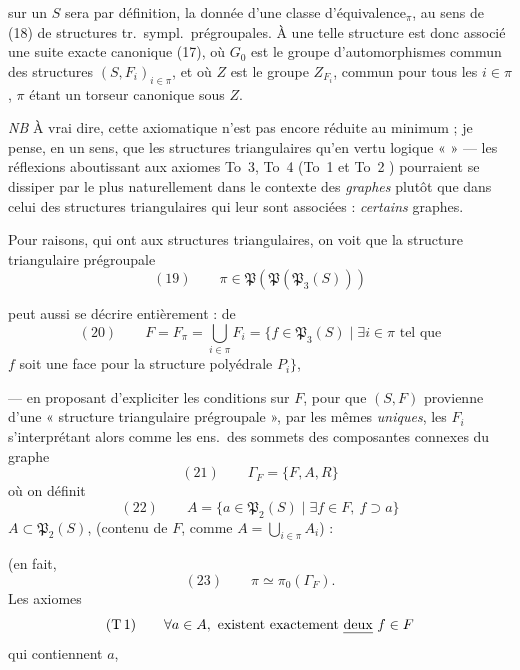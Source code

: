 \documentclass[11pt,a4paper]{article}
\begin{document}
sur  un $S$ sera par définition, la donnée
d'une classe d'équivalence$_\pi$, au sens de (18)
de structures tr.\ sympl.\ prégroupales.
À une telle structure est donc associé
une suite exacte canonique (17), où
$G_0$ est le groupe d'automorphismes commun des
structures $(S,F_i)_{i\in\pi}$, et où $Z$ est le
groupe $Z_{F_i}$, commun pour tous les $i\in\pi$,
$\pi$ étant un torseur canonique sous
$Z$.

\emph{NB} À vrai dire, cette axiomatique n'est pas
encore réduite au minimum ; je pense, en un
sens, que les structures triangulaires 
 qu'en vertu logique «  » —
les réflexions aboutissant aux axiomes
To~3, To~4 (To~1 et To~2  ) pourraient se dissiper
par le plus naturellement dans le contexte des
\emph{graphes} plutôt que dans celui des structures
triangulaires qui leur sont associées : \emph{certains} graphes.

Pour  raisons, qui ont  aux structures
triangulaires, on voit que la structure
triangulaire prégroupale
\[
(19)\qquad \pi\in\mathfrak{P}(\mathfrak{P}(\mathfrak{P}_3(S)))
\]

peut aussi se décrire entièrement : 
de
\[
(20)\qquad F=F_\pi=\bigcup_{i\in\pi}F_i=\{f\in\mathfrak{P}_3(S)\mid \exists i\in\pi \text{ tel que}
\]
\quad $f$ soit une face pour la structure polyédrale $P_i\}$,

— en proposant d'expliciter les conditions
sur $F$, pour que $(S,F)$ provienne d'une
« structure triangulaire prégroupale », par
 les mêmes \emph{uniques}, les $F_i$ s'interprétant
alors comme les ens.\ des sommets des
composantes connexes du graphe
\[
(21)\qquad \Gamma_F=\{F,A,R\}
\]
où on définit
\[
(22)\qquad A=\{a\in\mathfrak{P}_2(S)\mid \exists f\in F,\ f\supset a\}
\]
$A\subset\mathfrak{P}_2(S)$, (contenu de $F$, comme
$A=\bigcup_{i\in\pi}A_i$) :

(en fait, \ill{} \ill{}
\[
(23)\qquad \pi\simeq\pi_0(\Gamma_F).
\]
Les axiomes 
\[
(\mathrm{T}\,1)\qquad \forall a\in A, \text{ existent exactement \emph{deux} } f\in F
\]
\quad qui contiennent $a$,
\end{document}
